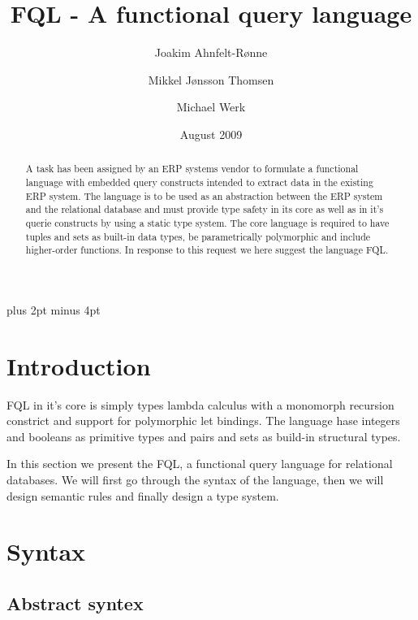 \documentclass[a4paper]{article}
\title{FQL - A functional query language}
\date{August 2009}
\author{Joakim Ahnfelt-Rønne \and Mikkel Jønsson Thomsen \and Michael Werk}
\begin{document}
\parindent=0pt
\parskip=8pt plus 2pt minus 4pt
\maketitle

\begin{abstract}\noindent
A task has been assigned by an ERP systems vendor to formulate a functional language with embedded query constructs intended to extract data in the existing ERP system. The language is to be used as an abstraction between the ERP system and the relational database and must provide type safety in its core as well as in it's querie constructs by using a static type system. The core language is required to have tuples and sets as built-in data types, be parametrically polymorphic and include higher-order functions. In response to this request we here suggest the language FQL.
\end{abstract}


\section{Introduction}

FQL in it's core is simply types lambda calculus with a monomorph recursion constrict and support for polymorphic let bindings. The language hase integers and booleans as primitive types and pairs and sets as build-in structural types. 


In this section we present the FQL, a functional query language for relational databases. We will first go through the syntax of the language, then we will design semantic rules and finally design a type system.

\section{Syntax}
\label{sec:syntax}

\subsection{Abstract syntex}
\label{abstractSyntax}
\end{document}
